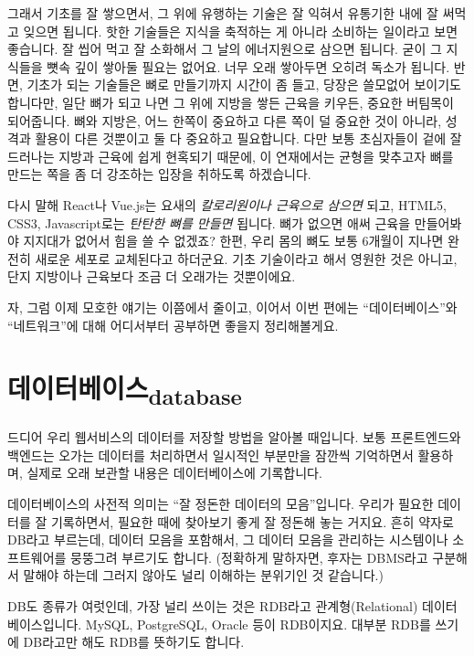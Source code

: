 \documentclass[11pt,a4paper]{article}
\newcommand{\sub}[1]{\textsubscript{#1}}
\begin{document}
그래서 기초를 잘 쌓으면서, 그 위에 유행하는 기술은 잘 익혀서 유통기한 내에 잘 써먹고 잊으면 됩니다. 핫한 기술들은 지식을 축적하는 게 아니라 소비하는 일이라고 보면 좋습니다. 잘 씹어 먹고 잘 소화해서 그 날의 에너지원으로 삼으면 됩니다. 굳이 그 지식들을 뼛속 깊이 쌓아둘 필요는 없어요. 너무 오래 쌓아두면 오히려 독소가 됩니다. 반면, 기초가 되는 기술들은 뼈로 만들기까지 시간이 좀 들고, 당장은 쓸모없어 보이기도 합니다만, 일단 뼈가 되고 나면 그 위에 지방을 쌓든 근육을 키우든, 중요한 버팀목이 되어줍니다. 뼈와 지방은, 어느 한쪽이 중요하고 다른 쪽이 덜 중요한 것이 아니라, 성격과 활용이 다른 것뿐이고 둘 다 중요하고 필요합니다. 다만 보통 초심자들이 겉에 잘 드러나는 지방과 근육에 쉽게 현혹되기 때문에, 이 연재에서는 균형을 맞추고자 뼈를 만드는 쪽을 좀 더 강조하는 입장을 취하도록 하겠습니다.

다시 말해 \textsf{React나 Vue.js}는 요새의 \emph{칼로리원이나 근육으로 삼으면} 되고, \textsf{HTML5, CSS3, Javascript}로는 \emph{탄탄한 뼈를 만들면} 됩니다. 뼈가 없으면 애써 근육을 만들어봐야 지지대가 없어서 힘을 쓸 수 없겠죠? 한편, 우리 몸의 뼈도 보통 6개월이 지나면 완전히 새로운 세포로 교체된다고 하더군요. 기초 기술이라고 해서 영원한 것은 아니고, 단지 지방이나 근육보다 조금 더 오래가는 것뿐이에요.

자, 그럼 이제 모호한 얘기는 이쯤에서 줄이고, 이어서 이번 편에는 ``데이터베이스''와 ``네트워크''에 대해 어디서부터 공부하면 좋을지 정리해볼게요.

\section[database]{데이터베이스\sub{database}}

드디어 우리 웹서비스의 데이터를 저장할 방법을 알아볼 때입니다. 보통 프론트엔드와 백엔드는 오가는 데이터를 처리하면서 일시적인 부분만을 잠깐씩 기억하면서 활용하며, 실제로 오래 보관할 내용은 데이터베이스에 기록합니다.

데이터베이스의 사전적 의미는 ``잘 정돈한 데이터의 모음''입니다. 우리가 필요한 데이터를 잘 기록하면서, 필요한 때에 찾아보기 좋게 잘 정돈해 놓는 거지요. 흔히 약자로 DB라고 부르는데, 데이터 모음을 포함해서, 그 데이터 모음을 관리하는 시스템이나 소프트웨어를 뭉뚱그려 부르기도 합니다. (정확하게 말하자면, 후자는 DBMS라고 구분해서 말해야 하는데 그러지 않아도 널리 이해하는 분위기인 것 같습니다.)

DB도 종류가 여럿인데, 가장 널리 쓰이는 것은 RDB라고 관계형(Relational) 데이터베이스입니다.  MySQL, PostgreSQL, Oracle 등이 RDB이지요. 대부분 RDB를 쓰기에 DB라고만 해도 RDB를 뜻하기도 합니다.
\end{document}
